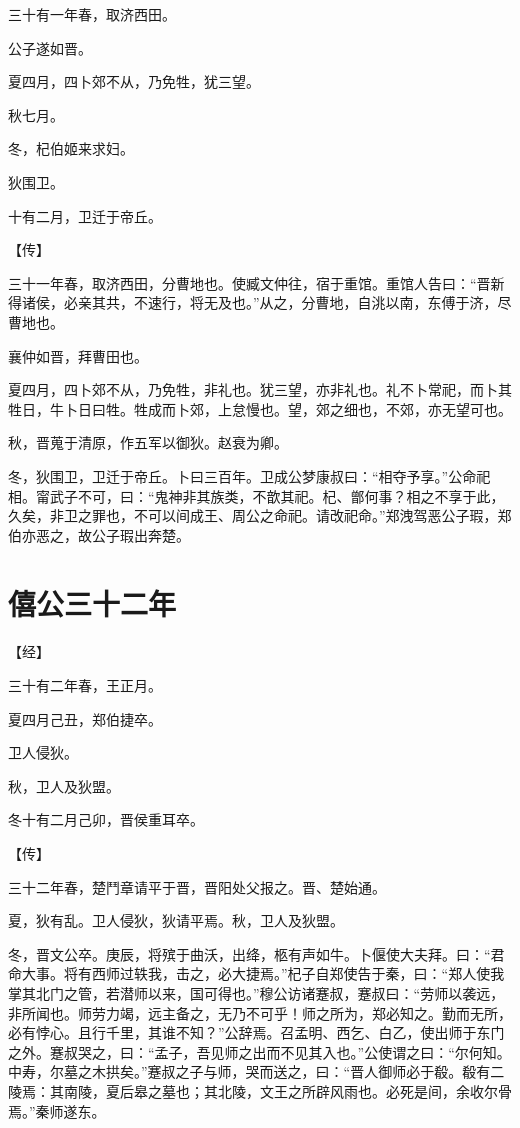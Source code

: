 \documentclass[a4paper,12pt,UTF8,twoside]{ctexbook}
\begin{document}
三十有一年春，取济西田。

公子遂如晋。

夏四月，四卜郊不从，乃免牲，犹三望。

秋七月。

冬，杞伯姬来求妇。

狄围卫。

十有二月，卫迁于帝丘。

【传】

三十一年春，取济西田，分曹地也。使臧文仲往，宿于重馆。重馆人告曰：“晋新得诸侯，必亲其共，不速行，将无及也。”从之，分曹地，自洮以南，东傅于济，尽曹地也。

襄仲如晋，拜曹田也。

夏四月，四卜郊不从，乃免牲，非礼也。犹三望，亦非礼也。礼不卜常祀，而卜其牲日，牛卜日曰牲。牲成而卜郊，上怠慢也。望，郊之细也，不郊，亦无望可也。

秋，晋蒐于清原，作五军以御狄。赵衰为卿。

冬，狄围卫，卫迁于帝丘。卜曰三百年。卫成公梦康叔曰：“相夺予享。”公命祀相。甯武子不可，曰：“鬼神非其族类，不歆其祀。杞、鄫何事？相之不享于此，久矣，非卫之罪也，不可以间成王、周公之命祀。请改祀命。”郑洩驾恶公子瑕，郑伯亦恶之，故公子瑕出奔楚。


\section{僖公三十二年}




【经】

三十有二年春，王正月。

夏四月己丑，郑伯捷卒。

卫人侵狄。

秋，卫人及狄盟。

冬十有二月己卯，晋侯重耳卒。

【传】

三十二年春，楚鬥章请平于晋，晋阳处父报之。晋、楚始通。

夏，狄有乱。卫人侵狄，狄请平焉。秋，卫人及狄盟。

冬，晋文公卒。庚辰，将殡于曲沃，出绛，柩有声如牛。卜偃使大夫拜。曰：“君命大事。将有西师过轶我，击之，必大捷焉。”杞子自郑使告于秦，曰：“郑人使我掌其北门之管，若潜师以来，国可得也。”穆公访诸蹇叔，蹇叔曰：“劳师以袭远，非所闻也。师劳力竭，远主备之，无乃不可乎！师之所为，郑必知之。勤而无所，必有悖心。且行千里，其谁不知？”公辞焉。召孟明、西乞、白乙，使出师于东门之外。蹇叔哭之，曰：“孟子，吾见师之出而不见其入也。”公使谓之曰：“尔何知。中寿，尔墓之木拱矣。”蹇叔之子与师，哭而送之，曰：“晋人御师必于殽。殽有二陵焉：其南陵，夏后皋之墓也；其北陵，文王之所辟风雨也。必死是间，余收尔骨焉。”秦师遂东。
\end{document}

